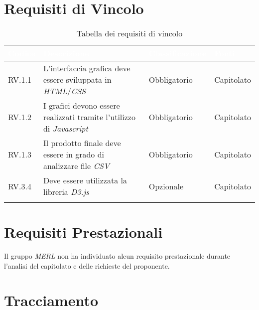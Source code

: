 \section{Requisiti di Vincolo}
\begin{center}
  \centering
  \begin{longtable}{|L{1,5cm}|C{5,5cm}|C{3cm}|C{2cm}|}
    \hline
    \textcolor[HTML]{FFFFFF}{\textbf{Codice}} & \textcolor[HTML]{FFFFFF}{\textbf{Descrizione}} & \textcolor[HTML]{FFFFFF}{\textbf{Classificazione}} & \textcolor[HTML]{FFFFFF}{\textbf{Fonti}}
    \\ \hline
    RV.1.1 & L'interfaccia grafica deve essere sviluppata in \textit{HTML}/\textit{CSS} & Obbligatorio & Capitolato \\ \hline
    RV.1.2 & I grafici devono essere realizzati tramite l'utilizzo di \textit{Javascript} & Obbligatorio & Capitolato \\ \hline
    RV.1.3 & Il prodotto finale deve essere in grado di analizzare file \textit{CSV} & Obbligatorio & Capitolato \\ \hline
    RV.3.4 & Deve essere utilizzata la libreria \textit{D3.js} & Opzionale & Capitolato \\ \hline

    \caption{Tabella dei requisiti di vincolo}
  \end{longtable}
\end{center}

\section{Requisiti Prestazionali}
Il gruppo \textit{MERL} non ha individuato alcun requisito prestazionale durante l'analisi del capitolato e delle richieste del proponente.


\section{Tracciamento}

